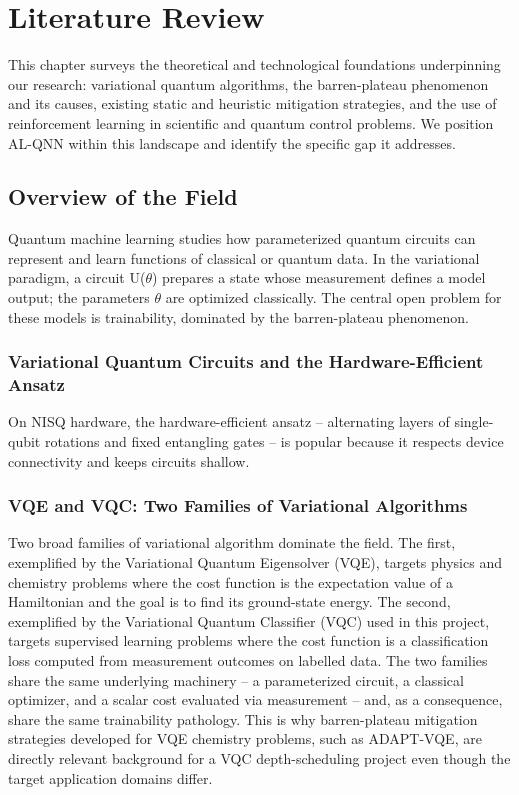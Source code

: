 \section{Literature Review}
\quad This chapter surveys the theoretical and technological foundations underpinning our research: variational quantum algorithms, the barren-plateau phenomenon and its causes, existing static and heuristic mitigation strategies, and the use of reinforcement learning in scientific and quantum control problems. We position AL-QNN within this landscape and identify the specific gap it addresses.

\subsection{Overview of the Field}
Quantum machine learning studies how parameterized quantum circuits can represent and learn functions of classical or quantum data. In the variational paradigm, a circuit U($\theta$) prepares a state whose measurement defines a model output; the parameters $\theta$ are optimized classically. The central open problem for these models is trainability, dominated by the barren-plateau phenomenon.

\subsubsection{Variational Quantum Circuits and the Hardware-Efficient Ansatz}
On NISQ hardware, the hardware-efficient ansatz -- alternating layers of single-qubit rotations and fixed entangling gates -- is popular because it respects device connectivity and keeps circuits shallow.

\subsubsection{VQE and VQC: Two Families of Variational Algorithms}
Two broad families of variational algorithm dominate the field. The first, exemplified by the Variational Quantum Eigensolver (VQE), targets physics and chemistry problems where the cost function is the expectation value of a Hamiltonian and the goal is to find its ground-state energy. The second, exemplified by the Variational Quantum Classifier (VQC) used in this project, targets supervised learning problems where the cost function is a classification loss computed from measurement outcomes on labelled data. The two families share the same underlying machinery -- a parameterized circuit, a classical optimizer, and a scalar cost evaluated via measurement -- and, as a consequence, share the same trainability pathology. This is why barren-plateau mitigation strategies developed for VQE chemistry problems, such as ADAPT-VQE, are directly relevant background for a VQC depth-scheduling project even though the target application domains differ.

